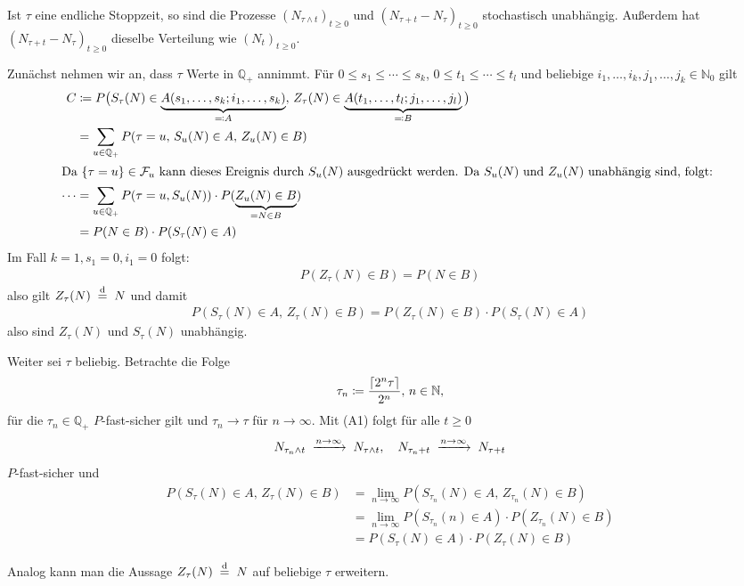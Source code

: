 \documentclass[a4paper,twoside,DIV15,BCOR12mm]{scrbook}
\newcommand{\cF}{\mathcal F}
\begin{document}
\begin{lemma}
\label{lem:7.2}
Ist $\tau$ eine endliche Stoppzeit, so sind die Prozesse $(N_{\tau \wedge t})_{t\ge 0}$ und $(N_{\tau + t}-N_\tau)_{t\ge 0}$ stochastisch unabhängig. Außerdem hat $(N_{\tau + t}-N_\tau)_{t\ge 0}$ dieselbe Verteilung wie $(N_t)_{t\ge 0}$.
\end{lemma}

\begin{beweis}
Zunächst nehmen wir an, dass $\tau$ Werte in $\mathbb Q_+$ annimmt. Für $0\le s_1\le\cdots\le s_k$, $0\le t_1\le \cdots\le t_l$ und beliebige $i_1,\ldots,i_k,j_1,\ldots,j_k\in \mathbb N_0$ gilt
\begin{align*}
C&\da P\big(S_\tau(N) \in \underbrace{A(s_1,\ldots,s_k;i_1,\ldots,s_k)}_{\ad A},\,
Z_\tau(N) \in \underbrace{A(t_1,\ldots,t_l;j_1,\ldots,j_l)}_{\ad B}
\big) \\
&= \sum_{u\in \mathbb Q_+} P(\tau = u,\, S_u(N)\in A,\, Z_u(N)\in B)\\
\intertext{Da $\{\tau = u \} \in \cF_u$ kann dieses Ereignis durch $S_u(N)$ ausgedrückt werden. Da $S_u(N)$ und $Z_u(N)$ unabhängig sind, folgt:
}
\cdots &= \sum_{u\in\mathbb Q_+} P(\tau = u, S_u(N)) \cdot P(\underbrace{Z_u(N)\in B}_{= N\in B}) \\
&= P(N\in B) \cdot P(S_\tau(N) \in A)
\end{align*}
Im Fall $k=1,s_1=0,i_1=0$ folgt:
\begin{align*}
P(Z_\tau(N)\in B) = P(N\in B)
\end{align*}
also gilt $Z_\tau(N) \gleichnach{d} N$ und damit
\begin{align*}
P(S_\tau (N) \in A,\, Z_\tau(N)\in B) = P(Z_\tau (N) \in B) \cdot P(S_\tau(N)\in A)
\end{align*}
also sind $Z_\tau(N)$ und $S_\tau(N)$ unabhängig.

Weiter sei $\tau$ beliebig. Betrachte die Folge 
\[
\tau_n \da \frac{\lceil 2^n \tau \rceil}{2^n},\, n\in \mathbb N,
\]
für die $\tau_n\in \mathbb Q_+$ $P$-fast-sicher gilt und $\tau_n\to \tau$ für $n\to\infty$. Mit (A1) folgt für alle $t\ge 0$
\[
N_{\tau_n\wedge t} \tomit{n\to\infty} N_{\tau \wedge t},\quad N_{\tau_n+t}\tomit{n\to\infty}N_{\tau+t}
\]
$P$-fast-sicher und
\begin{align*}
P(S_\tau(N)\in A,\, Z_\tau(N)\in B) 
&= \lim_{n\to\infty} P(S_{\tau_n}(N)\in A,\, Z_{\tau_n}(N)\in B) \\
&= \lim_{n\to\infty} P(S_{\tau_n}(n)\in A) \cdot P(Z_{\tau_n}(N)\in B)\\
&= P(S_\tau(N)\in A)\cdot P(Z_\tau(N)\in B)
\end{align*}

Analog kann man die Aussage $Z_\tau(N)\gleichnach{d}N$ auf beliebige $\tau$ erweitern.
\end{beweis}
\end{document}
